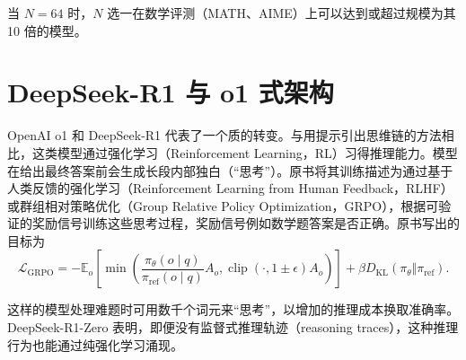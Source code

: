 当 \(N=64\) 时，\(N\) 选一在数学评测（MATH、AIME）上可以达到或超过规模为其 10 倍的模型。

\section{DeepSeek-R1 与 o1 式架构}

OpenAI o1 和 DeepSeek-R1 代表了一个质的转变。与用提示引出思维链的方法相比，这类模型通过强化学习（Reinforcement Learning，RL）习得推理能力。模型在给出最终答案前会生成长段内部独白（“思考”）。原书将其训练描述为通过基于人类反馈的强化学习（Reinforcement Learning from Human Feedback，RLHF）或群组相对策略优化（Group Relative Policy Optimization，GRPO），根据可验证的奖励信号训练这些思考过程，奖励信号例如数学题答案是否正确。原书写出的目标为
\[
  \mathcal{L}_{\mathrm{GRPO}}
  = -\mathbb{E}_o\left[
    \min\left(
      \frac{\pi_\theta(o\mid q)}{\pi_{\mathrm{ref}}(o\mid q)} A_o,
      \operatorname{clip}(\cdot,1\pm\epsilon) A_o
    \right)
  \right]+\beta D_{\mathrm{KL}}(\pi_\theta\Vert\pi_{\mathrm{ref}}).
\]

这样的模型处理难题时可用数千个词元来“思考”，以增加的推理成本换取准确率。DeepSeek-R1-Zero 表明，即便没有监督式推理轨迹（reasoning traces），这种推理行为也能通过纯强化学习涌现。

